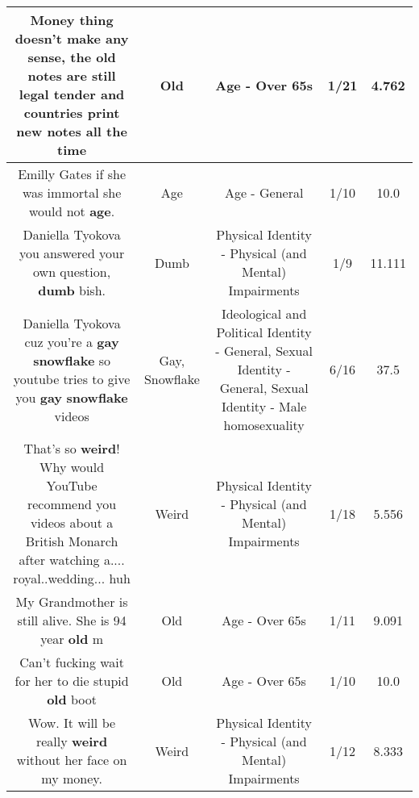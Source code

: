 \documentclass[11pt]{article}
\newlength\mylength
\begin{document}
\begin{center}
\begin{longtable}{|C{.65\mylength}|C{.30\mylength}|C{.12\mylength}|C{.12\mylength}|C{.12\mylength}|}
  \small Money thing doesn't make any sense, the \textbf{old} notes are still legal tender and countries print new notes all the time\normalsize   & Old & Age - Over 65s & 1/21 & 4.762 \\  \hline
  \small Emilly Gates if she was immortal she would not \textbf{age}.\normalsize   & Age & Age - General & 1/10 & 10.0 \\  \hline
  \small Daniella Tyokova you answered your own question, \textbf{dumb} bish.\normalsize   & Dumb & Physical Identity - Physical (and Mental) Impairments & 1/9 & 11.111 \\  \hline
  \small Daniella Tyokova cuz you're a \textbf{g\textbf{ay}} \textbf{snowflake} so youtube tries to give you \textbf{g\textbf{ay}} \textbf{snowflake} videos\normalsize   & Gay, Snowflake &  Ideological and Political Identity - General, Sexual Identity - General, Sexual Identity - Male homosexuality & 6/16 & 37.5 \\  \hline
  \small That's so \textbf{weird}! Why would YouTube recommend you videos about a British Monarch after watching a.... royal..wedding... huh\normalsize   & Weird & Physical Identity - Physical (and Mental) Impairments & 1/18 & 5.556 \\  \hline
  \small My Grandmother is still alive. She is 94 year \textbf{old} m\normalsize   & Old & Age - Over 65s & 1/11 & 9.091 \\  \hline
  \small Can't fucking wait for her to die stupid \textbf{old} boot\normalsize   & Old & Age - Over 65s & 1/10 & 10.0 \\  \hline
  \small Wow. It will be really \textbf{weird} without her face on my money.\normalsize   & Weird & Physical Identity - Physical (and Mental) Impairments & 1/12 & 8.333 \\  \hline

\end{longtable}
\end{center}
\end{document}
